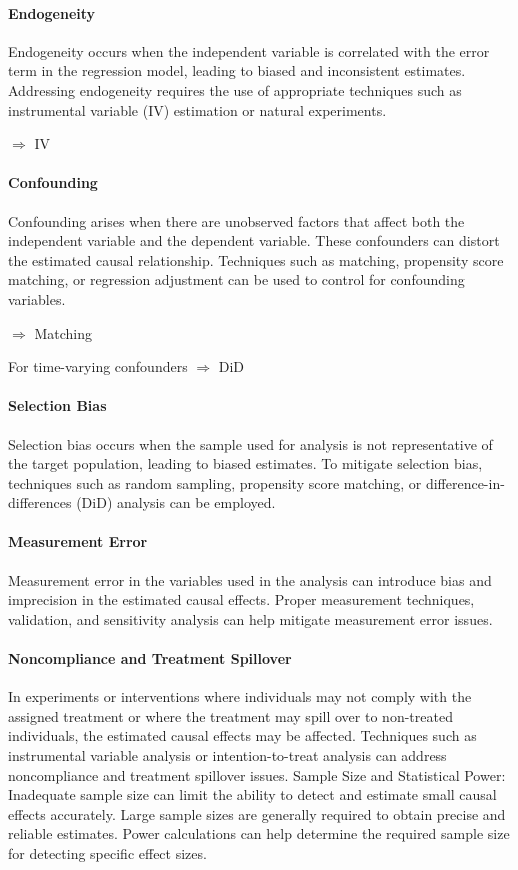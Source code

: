 \documentclass[a3paper, 8pt]{extarticle}
\begin{document}
\begin{multicols*}{5}
\paragraph{Endogeneity} Endogeneity occurs when the independent variable is correlated with the error term in the regression model, leading to biased and inconsistent estimates. Addressing endogeneity requires the use of appropriate techniques such as instrumental variable (IV) estimation or natural experiments.

$\Rightarrow$ IV

\paragraph{Confounding} Confounding arises when there are unobserved factors that affect both the independent variable and the dependent variable. These confounders can distort the estimated causal relationship. Techniques such as matching, propensity score matching, or regression adjustment can be used to control for confounding variables.

$\Rightarrow$ Matching

For time-varying confounders $\Rightarrow$ DiD

\paragraph{Selection Bias} Selection bias occurs when the sample used for analysis is not representative of the target population, leading to biased estimates. To mitigate selection bias, techniques such as random sampling, propensity score matching, or difference-in-differences (DiD) analysis can be employed.

\paragraph{Measurement Error} Measurement error in the variables used in the analysis can introduce bias and imprecision in the estimated causal effects. Proper measurement techniques, validation, and sensitivity analysis can help mitigate measurement error issues.

\paragraph{Noncompliance and Treatment Spillover} In experiments or interventions where individuals may not comply with the assigned treatment or where the treatment may spill over to non-treated individuals, the estimated causal effects may be affected. Techniques such as instrumental variable analysis or intention-to-treat analysis can address noncompliance and treatment spillover issues.
Sample Size and Statistical Power: Inadequate sample size can limit the ability to detect and estimate small causal effects accurately. Large sample sizes are generally required to obtain precise and reliable estimates. Power calculations can help determine the required sample size for detecting specific effect sizes.


\end{multicols*}
\end{document}
